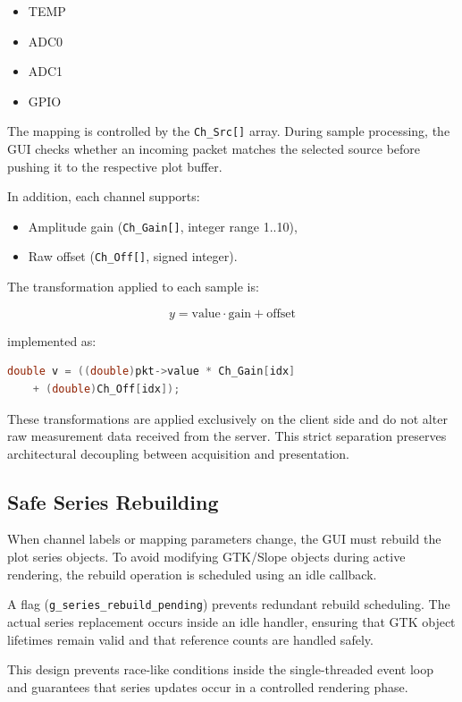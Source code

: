 \begin{itemize}
	\item TEMP
	\item ADC0
	\item ADC1
	\item GPIO
\end{itemize}

The mapping is controlled by the \texttt{Ch\_Src[]} array. During sample processing, the GUI checks whether an incoming packet matches the selected source before pushing it to the respective plot buffer.

In addition, each channel supports:

\begin{itemize}
	\item Amplitude gain (\texttt{Ch\_Gain[]}, integer range 1..10),
	\item Raw offset (\texttt{Ch\_Off[]}, signed integer).
\end{itemize}

The transformation applied to each sample is:

\[
y = \text{value} \cdot \text{gain} + \text{offset}
\]

implemented as:

\begin{lstlisting}[language=C]
	double v = ((double)pkt->value * Ch_Gain[idx]
	+ (double)Ch_Off[idx]);
\end{lstlisting}

These transformations are applied exclusively on the client side and do not alter raw measurement data received from the server. This strict separation preserves architectural decoupling between acquisition and presentation.

\subsection{Safe Series Rebuilding}
\label{sec:gui_series_rebuild}

When channel labels or mapping parameters change, the GUI must rebuild the plot series objects. To avoid modifying GTK/Slope objects during active rendering, the rebuild operation is scheduled using an idle callback.

A flag (\texttt{g\_series\_rebuild\_pending}) prevents redundant rebuild scheduling. The actual series replacement occurs inside an idle handler, ensuring that GTK object lifetimes remain valid and that reference counts are handled safely.

This design prevents race-like conditions inside the single-threaded event loop and guarantees that series updates occur in a controlled rendering phase.

